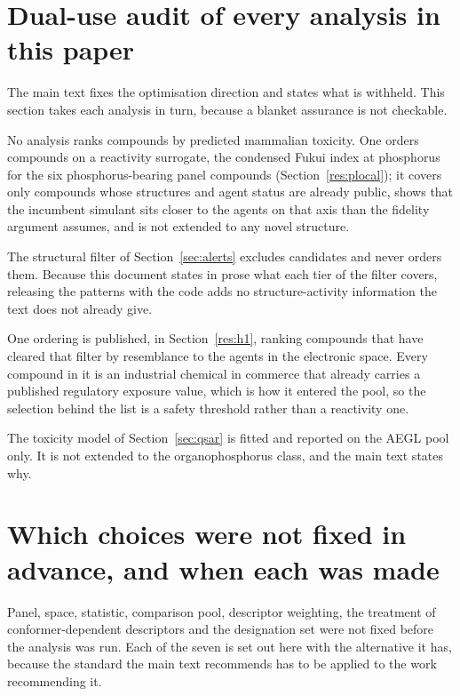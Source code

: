 \documentclass[11pt,a4paper]{article}
\begin{document}
\section{Dual-use audit of every analysis in this paper}
\label{sec:dualuse}

The main text fixes the optimisation direction and states what is withheld. This
section takes each analysis in turn, because a blanket assurance is not
checkable.

No analysis ranks compounds by predicted mammalian toxicity. One orders
compounds on a reactivity surrogate, the condensed Fukui index at phosphorus for
the six phosphorus-bearing panel compounds (Section~\ref{res:plocal}); it covers
only compounds whose structures and agent status are already public, shows that
the incumbent simulant sits closer to the agents on that axis than the fidelity
argument assumes, and is not extended to any novel structure.

The structural filter of Section~\ref{sec:alerts} excludes candidates and never
orders them. Because this document states in prose what each tier of the filter
covers, releasing the patterns with the code adds no structure-activity
information the text does not already give.

One ordering is published, in Section~\ref{res:h1}, ranking compounds that have
cleared that filter by resemblance to the agents in the electronic space. Every
compound in it is an industrial chemical in commerce that already carries a
published regulatory exposure value, which is how it entered the pool, so the
selection behind the list is a safety threshold rather than a reactivity one.

The toxicity model of Section~\ref{sec:qsar} is fitted and reported on the AEGL
pool only. It is not extended to the organophosphorus class, and the main text
states why.

\section{Which choices were not fixed in advance, and when each was made}
\label{meth:prespec}

Panel, space, statistic, comparison pool, descriptor weighting, the treatment
of conformer-dependent descriptors and the designation set were not fixed
before the analysis was run. Each of the seven is
set out here with the alternative it has, because the standard the main text
recommends has to be applied to the work recommending it.
\end{document}
